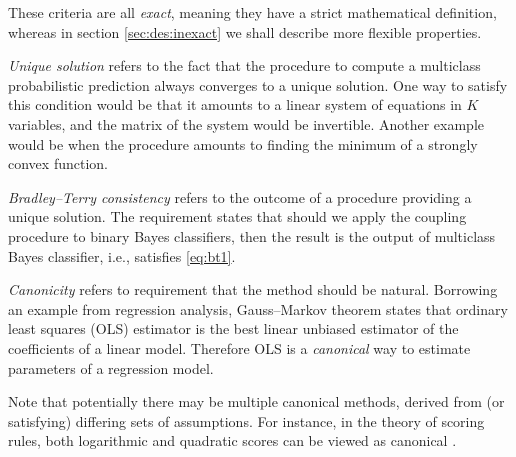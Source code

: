 \documentclass[pdflatex, sn-basic]{sn-jnl}%
\theoremstyle{thmstyleone}%
\theoremstyle{thmstyletwo}%
\theoremstyle{thmstylethree}%
\begin{document}
These criteria are all \emph{exact}, meaning they have a strict mathematical definition, whereas  in section \ref{sec:des:inexact} we shall describe more flexible properties. 
%



\emph{Unique solution} refers to the fact that the procedure to compute a multiclass probabilistic prediction always converges to a unique solution. One way to satisfy this condition would be that it amounts to a linear system of equations in $K$ variables, and the matrix of the system would be invertible. Another example would be when the procedure amounts to finding the minimum of a strongly convex function. 

\emph{Bradley--Terry consistency} refers to the outcome of a procedure providing a unique solution. The requirement states that should we apply the coupling procedure to binary Bayes classifiers, then the result is the output of multiclass Bayes classifier, i.e., satisfies \eqref{eq:bt1}.

\emph{Canonicity} refers to requirement that the method should be natural. Borrowing an example from regression analysis, Gauss--Markov theorem states that ordinary least squares (OLS) estimator is the best linear unbiased estimator of the coefficients of a linear model. Therefore OLS  is a \emph{canonical} way to estimate parameters of a regression model. 

Note that potentially there may be multiple canonical methods, derived from (or satisfying) differing sets of assumptions. For instance, in the theory of scoring rules, both logarithmic and quadratic scores can be viewed as canonical \cite{shannon1948mathematical,selten1998axiomatic}.
\end{document}
